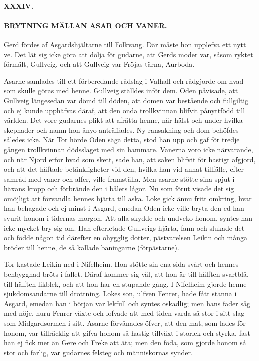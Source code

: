 \paragraph{XXXIV.}

\paragraph{BRYTNING MÄLLAN ASAR OCH VANER.}

Gerd fördes af Asgardshjältarne till Folkvang. Där måste hon upplefva
ett nytt ve. Det lät sig icke göra att dölja för gudarne, att Gerds
moder var, såsom ryktet förmält, Gullveig, och att Gullveig var Fröjas
tärna, Aurboda.

Asarne samlades till ett förberedande rådslag i Valhall och rådgjorde om
hvad som skulle göras med henne. Gullveig ställdes inför dem. Oden
påvisade, att Gullveig längesedan var dömd till döden, att domen var
bestående och fullgiltig och ej kunde upphäfvas däraf, att den onda
trollkvinnan blifvit pånyttfödd till världen. Det vore gudarnes plikt
att afrätta henne, när hälst och under hvilka skepnader och namn hon
ånyo anträffades. Ny ransakning och dom behöfdes således icke. När Tor
hörde Oden säga detta, stod han upp och gaf för tredje gången
trollkvinnan dödsslaget med sin hammare. Vanerna voro icke närvarande,
och när Njord erfor hvad som skett, sade han, att saken blifvit för
hastigt afgjord, och att det häftade betänkligheter vid den, hvilka han
vid annat tillfälle, efter samråd med vaner och alfer, ville framställa.
Men asarne stötte sina spjut i häxans kropp och förbrände den i bålets
lågor. Nu som förut visade det sig omöjligt att förvandla hennes hjärta
till aska. Loke gick ännu fritt omkring, hvar han behagade och ej minst
i Asgard, emedan Oden icke ville bryta den ed han svurit honom i
tidernas morgon. Att alla skydde och undveko honom, syntes han icke
mycket bry sig om. Han efterletade Gullveigs hjärta, fann och slukade
det och födde någon tid därefter en ohygglig dotter, pästvarelsen Leikin
och många bröder till henne, de så kallade baningarne (förpästarne).

Tor kastade Leikin ned i Nifelheim. Hon stötte sin ena sida svårt och
hennes benbyggnad bröts i fallet. Däraf kommer sig väl, att hon är till
hälften svartblå, till hälften likblek, och att hon har en stupande
gång. I Nifelheim gjorde henne
\protect\hypertarget{lb1625905.xhtmlux5cux23start140}{}{}\protect\hypertarget{lb1625905.xhtmlux5cux23start140-a}{}{}\protect\hypertarget{lb1625905.xhtmlux5cux23start140-b}{}{}\protect\hypertarget{lb1625905.xhtmlux5cux23start140-c}{}{}\protect\hypertarget{lb1625905.xhtmlux5cux23start140-d}{}{}
sjukdomsandarne till drottning. Lokes son, ulfven Fenrer, hade fått
stanna i Asgard, emedan han i början var lekfull och syntes oskadlig;
men hans fader såg med nöje, huru Fenrer växte och lofvade att med tiden
varda så stor i sitt slag som Midgardsormen i sitt. Asarne förvånades
öfver, att den mat, som lades för honom, var tillräcklig att gifva honom
så hastig tillväxt i storlek och styrka, fast han ej fick mer än Gere
och Freke att äta; men den föda, som gjorde honom så stor och farlig,
var gudarnes felsteg och människornas synder.

